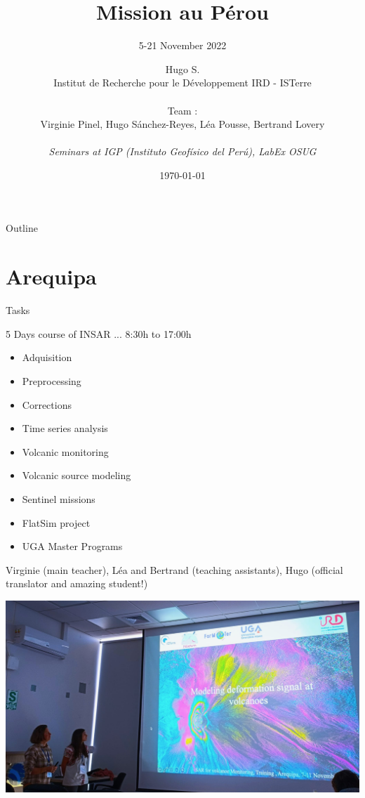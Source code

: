 \documentclass{beamer}
\title{{\normalsize \vskip 1cm Mission au P\'erou}}
\subtitle{\small 5-21 November 2022}
\author{Hugo S. \\ {\tiny Institut de Recherche pour le Développement IRD - ISTerre} \\ 
\\
Team : \\
Virginie Pinel, Hugo S\'anchez-Reyes, L\'ea Pousse, Bertrand Lovery\\
\\
\textit{Seminars at IGP (Instituto Geof\'isico del Per\'u), LabEx OSUG}
}
\date[2022]{\today}
\begin{document}
\begin{frame}
 \titlepage
\end{frame}

\begin{frame}

 {Outline}
  \tableofcontents
  
\end{frame}



\section{Arequipa}
 

 \begin{frame}
  
  {Tasks}
  
  5 Days course of INSAR ... 8:30h to 17:00h
  \vskip 0.5cm \pause
  \begin{itemize}
   \item Adquisition \pause
   \item Preprocessing \pause
   \item Corrections \pause
   \item Time series analysis \pause
   \item Volcanic monitoring \pause
   \item Volcanic source modeling \pause
   \item Sentinel missions \pause
   \item FlatSim project \pause
   \item UGA Master Programs \pause
  \end{itemize}

  Virginie (main teacher), L\'ea and Bertrand (teaching assistants), Hugo (official translator and amazing student!)

  
 \end{frame}

 
 \begin{frame}
 
 \includegraphics[width=1\linewidth]{images/CoursVirginieLéa.jpeg}
 
\end{frame}
\end{document}
